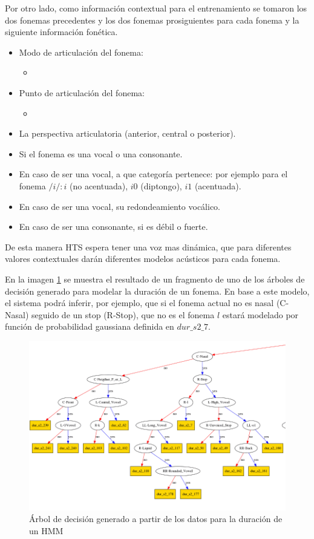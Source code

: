 Por otro lado, como información contextual para el entrenamiento se tomaron los dos fonemas precedentes y los dos fonemas prosiguientes para cada fonema y la siguiente información fonética.

\begin{itemize}
\item Modo de articulación del fonema:
\begin{itemize}
	\item \TODO
\end{itemize}
\item Punto de articulación del fonema:
\begin{itemize}
	\item \TODO
\end{itemize}
\item La perspectiva articulatoria (anterior, central o posterior).
\item Si el fonema es una vocal o una consonante.
\item En caso de ser una vocal, a que categoría pertenece: por ejemplo para el fonema $/i/:${$i$ (no acentuada), $i0$ (diptongo), $i1$ (acentuada)}.
\item En caso de ser una vocal, su redondeamiento vocálico.
\item En caso de ser una consonante, si es débil o fuerte.
\end{itemize}

De esta manera HTS espera tener una voz mas dinámica, que para diferentes valores contextuales darán diferentes modelos acústicos para cada fonema.

En la imagen \ref{genTree} se muestra el resultado de un fragmento de uno de los árboles de decisión generado para modelar la duración de un fonema. En base a este modelo, el sistema podrá inferir, por ejemplo, que si el fonema actual no es nasal (C-Nasal) seguido de un stop (R-Stop), que no es el fonema $l$ estará modelado por función de probabilidad gaussiana definida en $dur\_s2\_7$.

\begin{figure}
\begin{center}
\includegraphics[scale=0.4]{imagenes/arbolDeDesicionTesis.png}
\caption{Árbol de decisión generado a partir de los datos para la duración de un HMM}
\label{genTree}
\end{center}
\end{figure}

